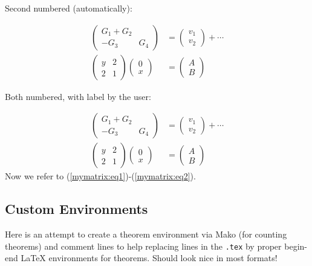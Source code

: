 \documentclass[%
oneside,                 %
final,                   %
10pt]{article}
\theoremstyle{definition}
\begin{document}
\begin{enumerate}
Second numbered (automatically):

\begin{align}
\begin{pmatrix}
G_1 + G_2\\ 
-G_3 & G_4
\end{pmatrix}
&=
\begin{pmatrix}
 v_1 \\ 
 v_2
\end{pmatrix}
+ \cdots\nonumber
\\ 
\left(\begin{array}{ll}
y & 2\\ 
2 & 1
\end{array}\right)
\left(\begin{array}{ll}
0 \\ x
\end{array}\right)
&= \begin{pmatrix}
A \\ B
\end{pmatrix}
\end{align}

Both numbered, with label by the user:

\begin{align}
\begin{pmatrix}
G_1 + G_2\\ 
-G_3 & G_4
\end{pmatrix}
&=
\begin{pmatrix}
 v_1 \\ 
 v_2
\end{pmatrix}
+ \cdots \label{mymatrix:eq1}
\\ 
\label{mymatrix:eq2}
\left(\begin{array}{ll}
y & 2\\ 
2 & 1
\end{array}\right)
\left(\begin{array}{ll}
0 \\ x
\end{array}\right)
&= \begin{pmatrix}
A \\ B
\end{pmatrix}
\end{align}
Now we refer to (\ref{mymatrix:eq1})-(\ref{mymatrix:eq2}).

\subsection{Custom Environments}

Here is an attempt to create a theorem environment via Mako
(for counting theorems) and comment lines to help replacing lines in
the \texttt{.tex} by proper begin-end {\LaTeX} environments for theorems.
Should look nice in most formats!


\end{enumerate}
\end{document}
